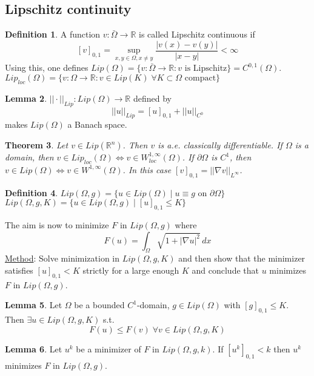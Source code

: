 \documentclass[a4paper, 12pt]{article}
\theoremstyle{plain}
\newtheorem{theorem}{Theorem}[section] %
\theoremstyle{definition}
\newtheorem{definition}[theorem]{Definition} %
\theoremstyle{lemma}
\newtheorem{lemma}[theorem]{Lemma}
\theoremstyle{remark}
\theoremstyle{corollary}
\theoremstyle{example}
\begin{document}
	\subsection{Lipschitz continuity}
	\begin{definition}
		A function $v: \bar{\Omega} \to \mathbb{R}$ is called Lipschitz continuous if \[[v]_{0,1} = \sup_{x,y \in \Omega, x \neq y} \frac{\left|v(x)-v(y)\right|}{\left|x-y\right|} < \infty\]
		Using this, one defines $Lip(\Omega) = \{v: \bar{\Omega} \to \mathbb{R}: v \text{ is Lipschitz}\} = C^{0,1}(\Omega)$.\\
		$Lip_{loc}(\Omega) = \{v: \Omega \to \mathbb{R}: v \in Lip(K)\;  \forall K \subset \Omega \text{ compact}\}$
	\end{definition}
	\begin{lemma}
		$||\cdot||_{Lip}: Lip(\Omega) \to \mathbb{R}$ defined by \[||u||_{Lip} = [u]_{0,1} + ||u||_{C^0}\] makes $Lip(\Omega)$ a Banach space.
	\end{lemma}
	\begin{theorem}
		Let $v \in Lip(\mathbb{R}^n)$. Then $v$ is a.e. classically differentiable. If $\Omega$ is a domain, then $v \in Lip_{loc}(\Omega) \Leftrightarrow v \in W_{loc}^{1,\infty}(\Omega)$. If $\partial \Omega$ is $C^1$, then $v \in Lip(\Omega) \Leftrightarrow v \in W^{1,\infty}(\Omega)$. In this case $[v]_{0,1} = ||\nabla v||_{L^\infty}$.
	\end{theorem}
	\begin{definition}
		$Lip(\Omega, g) = \{u \in Lip(\Omega) \mid u \equiv g \text{ on } \partial \Omega\}$\\
		$Lip(\Omega, g, K) = \{u \in Lip(\Omega,g) \mid [u]_{0,1} \leq K\}$
	\end{definition}
	The aim is now to minimize $F$ in $Lip(\Omega, g)$ where \[F(u) = \int_\Omega \sqrt{1 + \left|\nabla u\right|^2} \, dx\]
	\underline{Method}: Solve minimization in $Lip(\Omega, g, K)$ and then show that the minimizer satisfies $[u]_{0,1} < K$ strictly for a large enough $K$ and conclude that $u$ minimizes $F$ in $Lip(\Omega, g)$.
	\begin{lemma}
		Let $\Omega$ be a bounded $C^1$-domain, $g \in Lip(\Omega)$ with $[g]_{0,1} \leq K$. Then $\exists u \in Lip(\Omega, g, K)$ s.t. \[F(u) \leq F(v) \; \forall v \in Lip(\Omega, g, K)\]
	\end{lemma}
	\begin{lemma}
		Let $u^k$ be a minimizer of $F$ in $Lip(\Omega, g, k)$. If $[u^k]_{0,1} <k$ then $u^k$ minimizes $F$ in $Lip(\Omega,g)$.
	\end{lemma}
\end{document}

